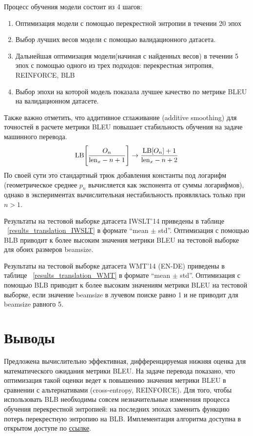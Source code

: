 \documentclass[14pt, a4paper]{extarticle}
\begin{document}
Процесс обучения модели состоит из 4 шагов:
\begin{enumerate}
  \item Оптимизация модели с помощью перекрестной энтропии в течении 20 эпох %
  \item Выбор лучших весов модели с помощью валидационного датасета. %
  \item Дальнейшая оптимизация модели(начиная с найденных весов) в течении 5 эпох с помощью одного из трех подходов: перекрестная энтропия, REINFORCE, BLB
  \item Выбор эпохи на которой модель показала лучшее качество по метрике BLEU на валидационном датасете.
\end{enumerate}
Также важно отметить, что аддитивное сглаживание (additive smoothing) для точностей в расчете метрики BLEU повышает стабильность обучения на задаче машинного перевода. 
$$\textrm{LB}\Bigg \lbrack \frac{O_n}{\textnormal{len}_x - n + 1} \Bigg \rbrack \rightarrow\frac{ \textrm{LB} \lbrack O_n \rbrack + 1}{\textnormal{len}_x - n + 2}
$$
По своей сути это стандартный трюк добавления константы под логарифм
(геометрическое среднее $p_n$ вычисляется как экспонента от суммы логарифмов), однако в экспериментах вычислительная нестабильность проявлялась только при $n > 1$.

Результаты на тестовой выборке датасета IWSLT'14 приведены в таблице ~\ref{results_translation_IWSLT} в формате ``mean $\pm$ std''. Оптимизация с помощью BLB приводит к более высоким значения метрики BLEU на тестовой выборке для обоих размеров beamsize.

Результаты на тестовой выборке датасета WMT'14 (EN-DE) приведены в таблице ~\ref{results_translation_WMT} в формате ``mean $\pm$ std''. Оптимизация с помощью BLB приводит к более высоким значениям метрики BLEU на тестовой выборке, если значение beamsize в лучевом поиске равно 1 и не приводит для beamsize равного 5. 

\section{Выводы}
Предложена вычислительно эффективная, дифференцируемая нижняя оценка для математического ожидания метрики BLEU. На задаче перевода показано, что оптимизация такой оценки ведет к повышению значения метрики BLEU в сравнении с альтернативами (cross-entropy, REINFORCE).
Для того, чтобы использовать BLB необходимы совсем незначительные изменения процесса обучения перекрестной энтропией: на последних эпохах заменить функцию потерь перекрестную энтропию на BLB. Имплементация алгоритма доступна в открытом доступе по \href{https://github.com/deepmipt/bleu_lower_bound}{ссылке}.
\end{document}
